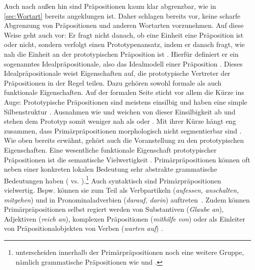 Auch nach außen hin sind Präpositionen kaum klar abgrenzbar, wie in \autoref{sec:Wortart} bereits angeklungen ist. 
Daher schlagen bereits \citet{Quirk.1964} vor, keine scharfe Abgrenzung von Pr{\"a}positionen und anderen Wortarten vorzunehmen. 
Auf diese Weise geht auch \citet[]{Lindqvist1994} vor: Er fragt nicht danach, ob eine Einheit eine Präposition ist oder nicht, sondern verfolgt einen Prototypenansatz, indem er danach fragt, wie nah die Einheit an der prototypischen Präposition ist \citep[s.][13]{Lindqvist1994}. 
Hierfür definiert er ein sogenanntes Idealpräpositionale, also das Ideal\-modell einer Pr{\"a}position \citep[s.][15--16]{Lindqvist1994}. 
Dieses Idealpräpositionale weist Eigenschaften auf, die prototypische Vertreter der Präpositionen in der Regel teilen. 
Dazu geh{\"o}ren sowohl formale als auch funktionale Eigenschaften. 
Auf der formalen Seite sticht vor allem die Kürze ins Auge: Prototypische Präpositionen sind meistens einsilbig und haben eine simple Silbenstruktur \citep[s.][§1430]{Duden2022}. 
Ausnahmen wie  und  weichen von dieser Einsilbigkeit ab und stehen dem Prototyp somit weniger nah als  oder .
Mit ihrer Kürze hängt eng zusammen, dass Primärpräpositionen morphologisch nicht segmentierbar sind \citep[s.][33]{Lehmann1992}. 
Wie oben bereits erwähnt, gehört auch die Voranstellung zu den prototypischen Eigenschaften.  
Eine wesentliche funktionale Eigenschaft prototypischer Präpositionen ist die semantische Vielwertigkeit \citep[s.][15]{Lindqvist1994}. 
Primärpräpositionen können oft neben einer konkreten lokalen Bedeutung sehr abstrakte grammatische Bedeutungen haben ( vs. ).\footnote{\citet[10--11]{Lehmann1992} unterscheiden innerhalb der Primärpräpositionen noch eine weitere Gruppe, nämlich grammatische Präpositionen wie  und .}
Auch syntaktisch sind Primärpräpositionen vielwertig.
Bspw. können sie zum Teil als Verbpartikeln (\textit{aufessen, anschalten, mitgehen}) und in Pronominaladverbien (\textit{darauf, darin}) auftreten~\citep[s.][275--276]{Lindqvist1994}.  
Zudem können Prim{\"a}rpr{\"a}positionen selbst regiert werden von Substantiven (\textit{Glaube an}), Adjektiven (\textit{reich an}), komplexen Pr{\"a}positionen (\textit{mithilfe von}) oder als Einleiter von Präpositionalobjekten von Verben (\textit{warten auf}) \parencites[s.][39]{Lehmann1992}[68]{Diewald.1997}.

